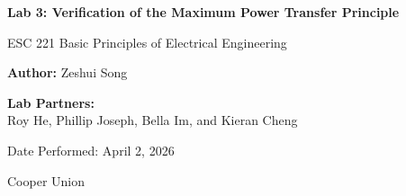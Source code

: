 \documentclass[12pt]{article}
\title{}
\date{}
\author{}
\begin{document}
\begin{titlepage}
    \centering
    \vspace*{1in}

    {\Large\bfseries Lab 3: Verification of the Maximum Power Transfer Principle \par}
    \vspace{1.5cm}

    {\large ESC 221 Basic Principles of Electrical Engineering \par}
    \vspace{2cm}

    {\large \textbf{Author:} Zeshui Song \par}
    \vspace{0.5cm}

    {\large \textbf{Lab Partners:}} \\
    Roy He, Phillip Joseph, Bella Im, and Kieran Cheng
    \vfill

    {\large Date Performed: April 2, 2026 \par}
    \vspace{0.8cm}

    {\large Cooper Union \par}

    \vspace*{1in}
\end{titlepage}
\newpage
\end{document}
